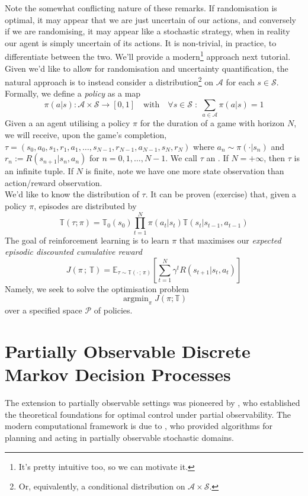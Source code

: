 \documentclass[12pt]{article}
\DeclareMathOperator*{\argmin}{argmin}
\begin{document}
Note the somewhat conflicting nature of these remarks. If randomisation is optimal, it may appear that we are just uncertain 
of our actions, and conversely if we are randomising, it may appear like a stochastic strategy, when in reality our agent is 
simply uncertain of its actions. It is non-trivial, in practice, to differentiate between the two. We'll provide a modern\footnote{
    It's pretty intuitive too, so we can motivate it. 
} approach next tutorial. \\

Given we'd like to allow for randomisation and uncertainty quantification, the natural approach is to instead consider a 
distribution\footnote{
    Or, equivalently, a conditional distribution on $\mathcal{A} \times \mathcal{S}$. 
} on $\mathcal{A}$ for each $s \in \mathcal{S}$. Formally, we define a 
\textit{policy} as a map 
$$
\pi(a | s): \mathcal{A} \times \mathcal{S} \to [0, 1] \quad \text{with} \quad \forall s \in \mathcal{S} \; : \;
\sum_{a \in \mathcal{A}} \pi(a | s) = 1
$$
Given a an agent utilising a policy $\pi$ for the duration of a game with horizon $N$, we will receive, upon the game's completion, 
$\tau = (s_0, a_0, s_1, r_1, a_1,  \dots, s_{N-1}, r_{N-1}, a_{N-1}, s_N, r_N)$ where $a_n \sim \pi(\cdot | s_n)$ and $r_n := R(s_{n+1} | 
s_{n}, a_{n})$ for $n = 0, 1, \dots, N-1$. We call $\tau$ an . If $N = +\infty$, then $\tau$ is an infinite tuple. 
If $N$ is finite, note we have one more state observation than action/reward observation. \\ 

We'd like to know the distribution of $\tau$. It can be proven (exercise) that, given a policy $\pi$, episodes are distributed 
by 
$$
\mathbb{T}(\tau ; \pi) = \mathbb{T}_0(s_0)\prod_{t=1}^N \pi(a_t | s_t)\mathbb{T}(s_t | s_{t-1}, a_{t-1})
$$
The goal of reinforcement learning is to learn $\pi$ that maximises our \textit{expected episodic discounted cumulative reward} 
$$
J(\pi \, ; \, \mathbb{T}) = \mathbb{E}_{\tau \sim \mathbb{T}(\cdot \, ; \, \pi)}\left[\sum_{t=1}^N \gamma^t R(s_{t+1} | s_t, a_t)\right]
$$
Namely, we seek to solve the optimisation problem 
$$
\argmin_{\pi} J(\pi ; \mathbb{T})
$$
over a specified space $\mathcal{P}$ of policies. 


\section{Partially Observable Discrete Markov Decision Processes}

The extension to partially observable settings was pioneered by \citet{smallwood_sondik_1973_optimal}, who established the theoretical 
foundations for optimal control under partial observability. The modern computational framework is due to 
\citet{kaelbling_littman_cassandra_1998_planning}, who provided algorithms for planning and acting in partially observable 
stochastic domains. \\
\end{document}
